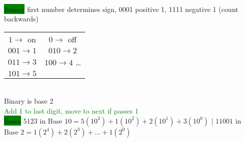 ~\\%
\color{blue}
\colorbox{Green}{Binary}
first number determines sign, 0001 positive 1, 1111 negative 1 (count backwards)
\begin{tabular}{c | c }
	$1\rightarrow$ on & $0\rightarrow$ off
	\\ $ 001 \rightarrow 1 $& $010\rightarrow2$
	\\ $ 011 \rightarrow 3$ & $100\rightarrow 4$ \ldots
	\\ $ 101 \rightarrow 5$
\end{tabular}
	\\ Binary is base 2
	\\\textcolor{Green}{Add 1 to last digit, move to next if passes 1}
	\\\colorbox{Green}{Bases}
	$5123$ in Base $10=5(10^3)+1(10^2)+2(10^1)+3(10^0)$ | $11001$ in Base $2=1(2^4)+2(2^3)+\ldots+1(2^0)$
 
